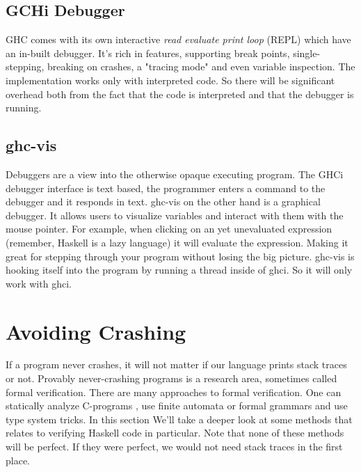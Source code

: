 \subsection{GCHi Debugger}

GHC comes with its own interactive \emph{read evaluate print loop} (REPL)
which have an in-built debugger. It's rich in features, supporting break
points, single-stepping, breaking on crashes, a "tracing mode" and even
variable inspection. The implementation works only with interpreted
code. \cite{ghci_debugger} So there will be significant overhead both
from the fact that the code is interpreted and that the debugger is
running.


\subsection{ghc-vis}

Debuggers are a view into the otherwise opaque executing program. The
GHCi debugger interface is text based, the programmer enters a command
to the debugger and it responds in text.  ghc-vis on the other hand is a
graphical debugger.  It allows users to visualize variables and interact
with them with the mouse pointer. For example, when clicking on an yet
unevaluated expression (remember, Haskell is a lazy language) it will
evaluate the expression.  Making it great for stepping through your
program without losing the big picture.  ghc-vis is hooking itself into
the program by running a thread inside of ghci. So it will only work
with ghci.  \cite{thesisFelsingBA}


\section{Avoiding Crashing} \label{sec:avoiding_crashing}

If a program never crashes,
it will not matter if our language prints stack traces or not. Provably never-crashing programs is a research area, sometimes called formal
verification. There are many approaches to formal verification. One
can statically analyze C-programs \cite{ckl2004},   %
use finite automata %
or formal grammars \cite{dantam2013motion} %
and use type system tricks. %
In this section We'll take a deeper look at some methods that
relates to verifying Haskell code in particular. Note that none
of these methods will be perfect. If they were perfect, we would not
need stack traces in the first place.

